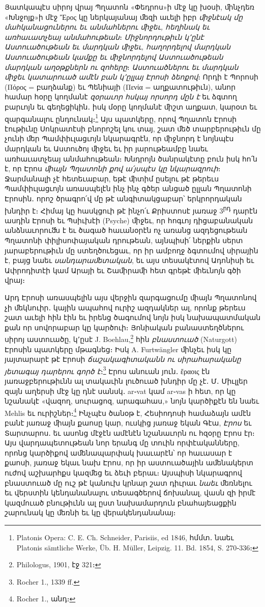 \documentclass{article}
\begin{document}
{Յատկապէս սիրոյ վրայ Պղատոն «Փեդրոս»ի մէջ կը խօսի, ﬕնչդեռ «Խնջոյք»ի մէջ Ἔρος կը ներկայանայ ﬔզի աւելի իբր \emph{ﬕջնէակ մը մահկանացուներու եւ անմահներու ﬕջեւ, հեղինակ եւ առհաւատչեայ անմահութեան}։ \emph{Միջնորդութիւն կ՚ընէ Աստուածութեան եւ մարդկան ﬕջեւ, հաղորդելով մարդկան Աստուածութեան կամքը եւ ﬕջնորդելով Աստուածութեան մարդկան աղօթքներն ու զոհերը}։ \emph{Աստուածներու եւ մարդկան ﬕջեւ կատարուած ամէն բան կ՚ըլլայ Էրոսի ձեոքով}։ Որդի է Պորոսի (Πόρος = բաղձանք) եւ Պենիայի (Πενία = աղքատութիւն), անոր համար հօրը կողմանէ \emph{զօրաւոր հսկայ որսորդ մըն է} եւ ձգտող բարւոյն եւ գեղեցիկին․ իսկ մօրը կողմանէ ﬕշտ աղքատ, կարօտ եւ զարգանալու ընդունակ։\footnote{Platonis Opera: C. E. Ch. Schneider, Parisiis, ed 1846, հմմտ․ նաեւ Platonis sämtliche Werke, Üb. H. Müller, Leipzig. 11. Bd. 1854, S. 270֊336։} Այս պատկերը, որով Պղատոն Էրոսի էութիւնը Սոկրատէսի բնորոշել կու տայ, շատ ﬔծ տարբերութիւն մը չունի ﬔր Պամփիւլացւոյն նկարագրէն, որ ﬕջնորդ է նոյնպէս մարդկան եւ Աստուծոյ ﬕջեւ եւ իր յարութեամբը նաեւ առհաւատչեայ անմահութեան։ Խնդրոյն ծանրակէտը բուն իսկ հո՛ն է, որ Էրոս \emph{ﬕայն Պղատոնի քով ա՛յսպէս կը նկարազրուի}։ Ջարմանալի չէ հետեւաբար, եթէ ﬕտիմ ըսելու թէ թերեւս Պամփիւլացւոյն առասպելէն ինչ ինչ գծեր անցած ըլլան Պղատոնի Էրոսին․ որոշ ծրագրո՛վ մը թէ անգիտակցաբար՝ երկրորդական խնդիր է։ Հիմայ կը հասկցուի թէ ինչո՛ւ Քրիստոսէ յառաջ 3\textsuperscript{րդ} դարէն ասդին Էրոսի եւ Պսիւխէի (Psyche) ﬕջեւ, որ հոգւոյ դիցաբանական անձնաւորուﬓ է եւ ծագած հաւանօրէն ոչ առանց ազդեցութեան Պղատոնի փիլիսոփայական դրութեան, այնպիսի՛ ներքին սերտ յարաբերութիւն մը ստեղծուեցաւ, որ իր ամբողջ ձգտումով սիրային է, բայց նաեւ \emph{սանդարաﬔտական}, եւ այս տեսակէտով Ադոնիսի եւ Ափրոդիտէի կամ Արայի եւ Շաﬕրաﬕ հետ գրեթէ ﬕեւնոյն գծի վրայ։

Արդ Էրոսի առասպելին այս վերջին զարգացումը ﬕայն Պղատոնով չի ﬔկնուիր․ կային ապահով ուրիշ ազդակներ ալ, որոնք թերեւս շատ աւելի հին էին եւ իրենց ծագումով նոյն իսկ նախապատմական քան որ սովորաբար կը կարծուի։ Յոնիական բանաստեղծներու սիրոյ աստուածը, կ՚ըսէ J. Boehlau,\footnote{Philologus, 1901, էջ 321։} հին \emph{բնաստուած} (Naturgott) Էրոսին պատկերը մթագնեց։ Իսկ A. Furtwängler ﬕնչեւ իսկ կը յայտարարէ թէ Էրոսի \emph{ճաշակագիտականն ու սիրահարականը յետագայ դարերու գործ է}։\footnote{Rocher 1., 1339 ff.} Էրոս անուան յուն․ ἔραοις էն յառաջբերութիւնն ալ տակաւին լուծուած խնդիր մը չէ․ Մ․ Միւլլեր զայն աղերսի մէջ կը դնէ սանսկ․ ar֊vat կամ ar֊vas ի հետ, որ կը նշանակէ «վազող, սուրացոզ, արագահաս,» նոյն կարծիքէն են նաեւ Mehlis եւ ուրիշներ։\footnote{Rocher 1., անդ։} Ինչպէս ծանօթ է, Հեսիոդոսի համաձայն ամէն բանէ յառաջ ﬕայն քաոսը կար, ուսկից յառաջ եկան Գէա, \emph{Էրոս} եւ Տարտարոս․ եւ ասոնց մէջէն ամէնէն նշանաւորն ու հզօրը Էրոս էր։ Այս վարդապետութեան նոր երանգ մը տուին որփէականները, որոնց կարծիքով աﬔնապարփակ խաւարէն՝ որ հաւասար է քաոսի, յառաջ եկաւ նախ Էրոս, որ իր աստուածային աﬔնակերտ ուժով աշխարհքս կազﬔց եւ ձեւի բերաւ։ Այսպիսի նկարագրով բնաստուած մը ուշ թէ կանուխ կրնար շատ դիւրաւ \emph{նաեւ} ﬔռնելու եւ վերստին կենդանանալու տեսագծերով ճոխանալ, վասն զի իրմէ կազմուած բնութիւնն ալ ըստ նախամարդուն բնահայեացքին շարունակ կը ﬔռնի եւ կը վերակենդանանայ։

}
\end{document}

